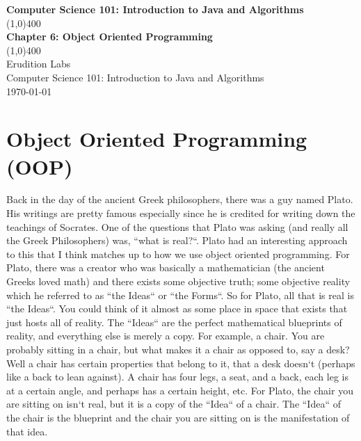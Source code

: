 \documentclass[11]{article}
\begin{document}
\begin{titlepage}
\begin{center}
\vspace{1cm}
\Large{\textbf{Computer Science 101: Introduction to Java and Algorithms}}\\
\vfill
\line(1,0){400}\\
\huge{\textbf{Chapter 6: Object Oriented Programming}}\\
\line(1,0){400}\\
\vfill
Erudition Labs\\
Computer Science 101: Introduction to Java and Algorithms\\
\today\\
\end{center}
\end{titlepage}

\tableofcontents
\thispagestyle{empty}
\clearpage
\setcounter{page}{1}


\section{Object Oriented Programming (OOP)}
Back in the day of the ancient Greek philosophers, there was a guy named Plato. His writings are pretty famous especially since he is credited for writing down the teachings of Socrates. One of the questions that Plato was asking (and really all the Greek Philosophers) was, ``what is real?``. Plato had an interesting approach to this that I think matches up to how we use object oriented programming. For Plato, there was a creator who was basically a mathematician (the ancient Greeks loved math) and there exists some objective truth; some objective reality which he referred to as ``the Ideas`` or ``the Forms``. So for Plato, all that is real is ``the Ideas``. You could think of it almost as some place in space that exists that just hosts all of reality. The ``Ideas`` are the perfect mathematical blueprints of reality, and everything else is merely a copy. For example, a chair. You are probably sitting in a chair, but what makes it a chair as opposed to, say a desk? Well a chair has certain properties that belong to it, that a desk doesn`t (perhaps like a back to lean against). A chair has four legs, a seat, and a back, each leg is at a certain angle, and perhaps has a certain height, etc. For Plato, the chair you are sitting on isn`t real, but it is a copy of the ``Idea`` of a chair. The ``Idea`` of the chair is the blueprint and the chair you are sitting on is the manifestation of that idea.\\
\end{document}
